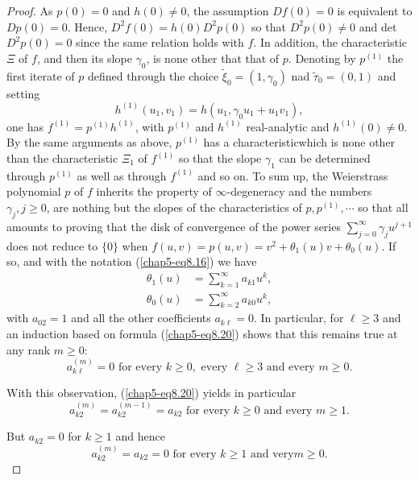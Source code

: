 \begin{proof}
As $p(0) = 0$ and $h(0) \neq 0$, the assumption $Df(0) = 0$ is
equivalent to $Dp(0) = 0$. Hence, $D^{2}f(0) = h(0)D^{2}p(0)$ so that
$D^{2}p(0) \neq 0$ and det $D^{2}p(0) = 0$ since the same relation
holds with $f$. In addition, the characteristic $\Xi$ of $f$, and then its
slope $\gamma_{0}$, is none other that that of $p$. Denoting by
$p^{(1)}$ the first iterate of $p$ defined through the choice
$\widetilde{\xi}_{0} = (1, \gamma_{0})$ nad $\widetilde{\tau}_{0} =
(0, 1)$ and setting
$$
h^{(1)} (u_{1}, v_{1}) = h(u_{1}, \gamma_{0}u_{1} + u_{1}v_{1}),
$$
one has $f^{(1)} = p^{(1)} h^{(1)}$, with $p^{(1)}$ and $h^{(1)}$
real-analytic and $h^{(1)}(0) \neq 0$. By the same arguments as above,
$p^{(1)}$ has a characteristic\pageoriginale which is none other than the
characteristic $\Xi_{1}$ of $f^{(1)}$ so that the slope $\gamma_{1}$
can be determined through $p^{(1)}$ as well as through $f^{(1)}$ and
so on. To sum up, the Weierstrass polynomial $p$ of $f$ inherits the
property of $\infty$-degeneracy and the numbers $\gamma_{j}, j \geq
0$, are nothing but the slopes of the characteristics of $p, p^{(1)},
\cdots$ so that all amounts to proving that the disk of convergence of
the power series $\sum\limits_{j=0}^{\infty} \gamma_{j} u^{j+1}$ does
not reduce to $\{0\}$ when $f(u, v) = p(u, v) = v^{2} + \theta_{1}(u)v
+ \theta_{0}(u)$. If so, and with the notation (\ref{chap5-eq8.16}) we
have
\begin{align*}
\theta_{1}(u) & = \sum\limits_{k=1}^{\infty} a_{k1}
u^{k},\tag{8.22}\label{chap5-eq8.22}\\ 
 \theta_{0}(u) & = \sum\limits_{k=2}^{\infty} a_{k0} u^{k},\tag{8.23}\label{chap5-eq8.23}
\end{align*}
with $a_{02} = 1$ and all the other coefficients $a_{k\ell} = 0$. In
particular, for $\ell \geq 3$ and an induction based on formula
(\ref{chap5-eq8.20}) shows that this remains true at any rank $m \geq
0$:
\begin{equation*}
a_{k\ell}^{(m)} = 0 \text{ for every } k \geq 0, \text{ every } \ell
\geq 3 \text{ and every } m \geq 0.\tag{8.24}\label{chap5-eq8.24}
\end{equation*}

With this observation, (\ref{chap5-eq8.20}) yields in particular
$$
a_{k2}^{(m)} = a_{k2}^{(m-1)} = a_{k2} \text{ for every } k \geq 0
\text{ and every } m \geq 1.
$$

But $a_{k2} = 0$ for $k \geq 1$ and hence
\begin{equation*}
a_{k2}^{(m)} = a_{k2} = 0 \text{ for every } k \geq 1 \text{ and very
} m \geq 0.\tag{8.25}\label{chap5-eq8.25}
\end{equation*}


\end{proof}
